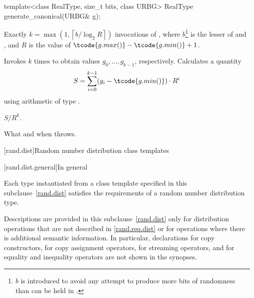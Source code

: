 %
\begin{itemdecl}
template<class RealType, size_t bits, class URBG>
 RealType generate_canonical(URBG& g);
\end{itemdecl}

\begin{itemdescr}
\pnum\complexity Exactly
 $k = \max(1, \left\lceil b / \log_2 R \right\rceil)$
 invocations
 of ,
 where $b$\footnote{$b$ is introduced
   to avoid any attempt
   to produce more bits of randomness
   than can be held in .}
   is the lesser of 
                and ,
 and
   $R$ is the value of $\tcode{g.max()} - \tcode{g.min()} + 1$.

\pnum\effects
 Invokes  $k$ times
 to obtain values $g_0, \dotsc, g_{k-1}$, respectively.
 Calculates a quantity
 \[
   S = \sum_{i=0}^{k-1} (g_i - \tcode{g.min()})
                        \cdot R^i
 \]
 using arithmetic of type
 .

\pnum
\returns $S / R^k$.

\pnum\throws What and when  throws.
\end{itemdescr}%




[rand.dist]{Random number distribution class templates}%

[rand.dist.general]{In general}

\pnum
Each type instantiated
from a class template specified in this subclause~\ref{rand.dist}
satisfies the requirements
of a random number distribution type.

\pnum
Descriptions are provided in this subclause~\ref{rand.dist}
only for distribution operations
that are not described in \ref{rand.req.dist}
or for operations where there is additional semantic information.
In particular,
declarations for copy constructors,
for copy assignment operators,
for streaming operators,
and for equality and inequality operators
are not shown in the synopses.

